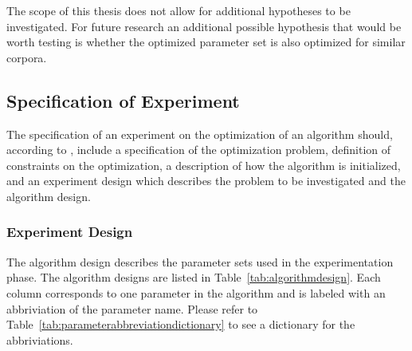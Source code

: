
The scope of this thesis does not allow for additional hypotheses to be investigated. For future research an additional possible hypothesis that would be worth testing is whether the optimized parameter set is also optimized for similar corpora.

\subsection{Specification of Experiment}
The specification of an experiment on the optimization of an algorithm should, according to \citeauthor{Bartz-Beielstein2004}, include a specification of the optimization problem, definition of constraints on the optimization, a description of how the algorithm is initialized, and an experiment design which describes the problem to be investigated and the algorithm design.


\subsubsection{Experiment Design}
The algorithm design describes the parameter sets used in the experimentation phase. The algorithm designs are listed in Table~\ref{tab:algorithmdesign}. Each column corresponds to one parameter in the algorithm and is labeled with an abbriviation of the parameter name. Please refer to Table~\ref{tab:parameterabbreviationdictionary} to see a dictionary for the abbriviations.

